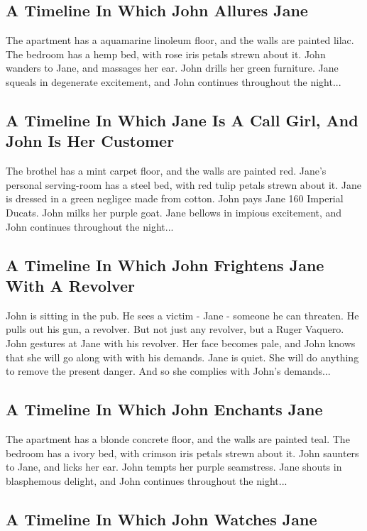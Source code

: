 \documentclass{article}
\begin{document}
\subsection{A Timeline In Which John Allures Jane}


The apartment has a aquamarine linoleum floor, and the walls are painted lilac.
The bedroom has a hemp bed, with rose iris petals strewn about it.
John wanders to Jane, and massages her ear.
John drills her green furniture.
Jane squeals in degenerate excitement, and John continues throughout the night...
\subsection{A Timeline In Which Jane Is A Call Girl, And John Is Her Customer}


The brothel has a mint carpet floor, and the walls are painted red.
Jane's personal serving{-}room has a steel bed, with red tulip petals strewn about it.
Jane is dressed in a green negligee made from cotton.
John pays Jane 160 Imperial Ducats.
John milks her purple goat.
Jane bellows in impious excitement, and John continues throughout the night...
\subsection{A Timeline In Which John Frightens Jane With A Revolver}


John is sitting in the pub.
He sees a victim {-} Jane {-} someone he can threaten. He pulls out his gun, a revolver.
But not just any revolver, but a Ruger Vaquero.
John gestures at Jane with his revolver. Her face becomes pale, and John knows that she will go along with with his demands.
Jane is quiet. She will do anything to remove the present danger. And so she complies with John's demands...
\subsection{A Timeline In Which John Enchants Jane}


The apartment has a blonde concrete floor, and the walls are painted teal.
The bedroom has a ivory bed, with crimson iris petals strewn about it.
John saunters to Jane, and licks her ear.
John tempts her purple seamstress.
Jane shouts in blasphemous delight, and John continues throughout the night...
\subsection{A Timeline In Which John Watches Jane}
\end{document}
